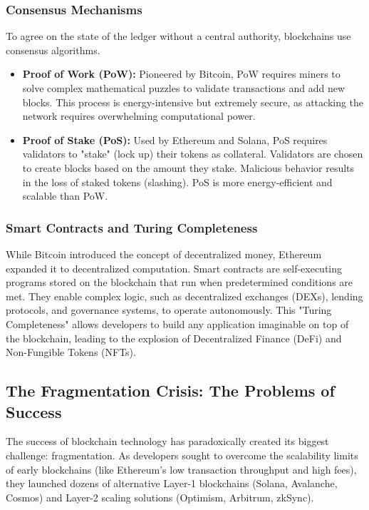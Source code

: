 \documentclass[11pt,a4paper]{article}
\begin{document}
\subsubsection{Consensus Mechanisms}
To agree on the state of the ledger without a central authority, blockchains use consensus algorithms.
\begin{itemize}
    \item \textbf{Proof of Work (PoW):} Pioneered by Bitcoin, PoW requires miners to solve complex mathematical puzzles to validate transactions and add new blocks. This process is energy-intensive but extremely secure, as attacking the network requires overwhelming computational power.
    \item \textbf{Proof of Stake (PoS):} Used by Ethereum and Solana, PoS requires validators to "stake" (lock up) their tokens as collateral. Validators are chosen to create blocks based on the amount they stake. Malicious behavior results in the loss of staked tokens (slashing). PoS is more energy-efficient and scalable than PoW.
\end{itemize}

\subsubsection{Smart Contracts and Turing Completeness}
While Bitcoin introduced the concept of decentralized money, Ethereum expanded it to decentralized computation. Smart contracts are self-executing programs stored on the blockchain that run when predetermined conditions are met. They enable complex logic, such as decentralized exchanges (DEXs), lending protocols, and governance systems, to operate autonomously. This "Turing Completeness" allows developers to build any application imaginable on top of the blockchain, leading to the explosion of Decentralized Finance (DeFi) and Non-Fungible Tokens (NFTs).

\subsection{The Fragmentation Crisis: The Problems of Success}
The success of blockchain technology has paradoxically created its biggest challenge: fragmentation. As developers sought to overcome the scalability limits of early blockchains (like Ethereum's low transaction throughput and high fees), they launched dozens of alternative Layer-1 blockchains (Solana, Avalanche, Cosmos) and Layer-2 scaling solutions (Optimism, Arbitrum, zkSync).
\end{document}
